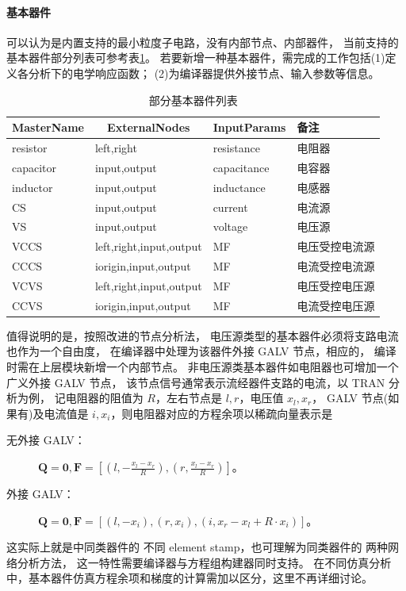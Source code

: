 \paragraph{基本器件}
可以认为是内置支持的最小粒度子电路，没有内部节点、内部器件，
当前支持的基本器件部分列表可参考表\ref{tab:basic-elements-partial-list}。
若要新增一种基本器件，需完成的工作包括(1)定义各分析下的电学响应函数；
(2)为编译器提供外接节点、输入参数等信息。
\begin{table}[htpb]
  \centering
  \caption{部分基本器件列表}
  \label{tab:basic-elements-partial-list}
  \begin{tabular}{l|l|l|l}
    \hline
     \multicolumn{1}{c}{MasterName}   & \multicolumn{1}{|c|}{ExternalNodes} &
     \multicolumn{1}{c|}{InputParams} & 备注             \\
    \hline
     resistor   & left,right              & resistance  & 电阻器           \\
     capacitor  & input,output            & capacitance & 电容器           \\
     inductor   & input,output            & inductance  & 电感器           \\
     CS         & input,output            & current     & 电流源           \\
     VS         & input,output            & voltage     & 电压源           \\
     VCCS       & left,right,input,output & MF          & 电压受控电流源   \\
     CCCS       & iorigin,input,output    & MF          & 电流受控电流源   \\
     VCVS       & left,right,input,output & MF          & 电压受控电压源   \\
     CCVS       & iorigin,input,output    & MF          & 电流受控电压源   \\
    \hline
  \end{tabular}
\end{table}

值得说明的是，按照改进的节点分析法\cite{ho1975modified}，
电压源类型的基本器件必须将支路电流也作为一个自由度，
在编译器中处理为该器件外接 GALV 节点，相应的，
编译时需在上层模块新增一个内部节点。
非电压源类基本器件如电阻器也可增加一个广义外接 GALV 节点，
该节点信号通常表示流经器件支路的电流，以 TRAN 分析为例，
记电阻器的阻值为 $R$，左右节点是 $l,r$，电压值 $x_l,x_r$，
GALV 节点(如果有)及电流值是 $i,x_i$，则电阻器对应的方程余项以稀疏向量表示是
\begin{description}
  \item[无外接 GALV：] $\bm{Q}=\bm{0},\bm{F}=[(l,-\frac{x_l-x_r}{R}),(r,\frac{x_l-x_r}{R})]$。
  \item[外接 GALV：] $\bm{Q}=\bm{0},\bm{F}=[(l,-x_i),(r,x_i),(i,x_r-x_l+R\cdot x_i)]$。
\end{description}
这实际上就是\cite[Sec 2.4.4]{najm2010circuit}中同类器件的
不同 element stamp，也可理解为同类器件的
两种网络分析方法\cite{ho1975modified,hachtel1971sparse}，
这一特性需要编译器与方程组构建器同时支持。
在不同仿真分析中，基本器件仿真方程余项和梯度的计算需加以区分，这里不再详细讨论。


